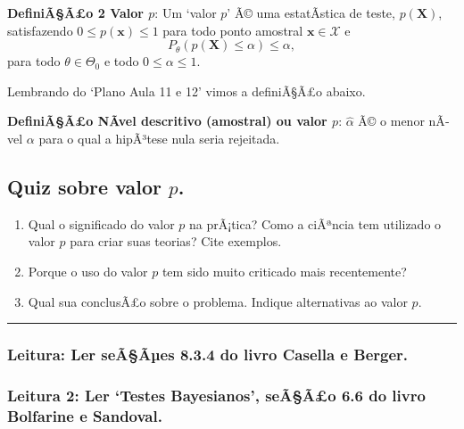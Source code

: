 \documentclass[]{article}
\providecommand{\tightlist}{%
  \setlength{\itemsep}{0pt}\setlength{\parskip}{0pt}}
\begin{document}
\vspace{1cm}

\textbf{DefiniÃ§Ã£o 2 Valor \(p\)}: Um `valor \(p\)' Ã© uma estatÃ­stica
de teste, \(p(\boldsymbol{X})\), satisfazendo
\(0 \leq p(\boldsymbol{x}) \leq 1\) para todo ponto amostral
\(\boldsymbol{x} \in \mathcal{X}\) e
\[ P_\theta (p(\boldsymbol{X}) \leq \alpha) \leq \alpha, \] para todo
\(\theta \in \Theta_0\) e todo \(0 \leq \alpha \leq 1\).

\vspace{0.5cm}

Lembrando do `Plano Aula 11 e 12' vimos a definiÃ§Ã£o abaixo.

\vspace{1cm}

\textbf{DefiniÃ§Ã£o NÃ­vel descritivo (amostral) ou valor \(p\)}:
\(\hat \alpha\) Ã© o menor nÃ­vel \(\alpha\) para o qual a hipÃ³tese
nula seria rejeitada.

\subsection{\texorpdfstring{Quiz sobre valor
\(p\).}{Quiz sobre valor p.}}\label{quiz-sobre-valor-p.}

\begin{enumerate}
\def\labelenumi{\arabic{enumi}.}
\tightlist
\item
  Qual o significado do valor \(p\) na prÃ¡tica? Como a ciÃªncia tem
  utilizado o valor \(p\) para criar suas teorias? Cite exemplos.
\item
  Porque o uso do valor \(p\) tem sido muito criticado mais
  recentemente?
\item
  Qual sua conclusÃ£o sobre o problema. Indique alternativas ao valor
  \(p\).
\end{enumerate}

\vspace{0.5cm}

\begin{center}\rule{0.5\linewidth}{\linethickness}\end{center}

\subsubsection{Leitura: Ler seÃ§Ãµes 8.3.4 do livro Casella e
Berger.}\label{leitura-ler-seaaes-8.3.4-do-livro-casella-e-berger.}

\subsubsection{\texorpdfstring{Leitura 2: Ler `Testes Bayesianos',
seÃ§Ã£o 6.6 do livro Bolfarine e
Sandoval.}{Leitura 2: Ler Testes Bayesianos, seÃ§Ã£o 6.6 do livro Bolfarine e Sandoval.}}\label{leitura-2-ler-testes-bayesianos-seaao-6.6-do-livro-bolfarine-e-sandoval.}
\end{document}
